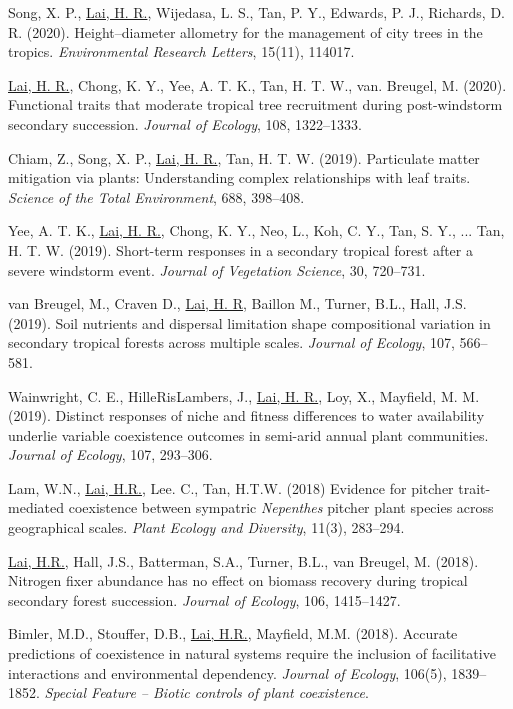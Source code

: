 \documentclass[a4paper]{article}
\begin{document}
\hangindent=1cm Song, X. P., \underline{Lai, H. R.}, Wijedasa, L. S., Tan, P. Y., Edwards, P. J., Richards, D. R. (2020). Height--diameter allometry for the management of city trees in the tropics. \textit{Environmental Research Letters}, 15(11), 114017.

\hangindent=1cm \underline{Lai, H. R.}, Chong, K. Y., Yee, A. T. K., Tan, H. T. W., van. Breugel, M. (2020). Functional traits that moderate tropical tree recruitment during post-windstorm secondary succession. \textit{Journal of Ecology}, 108, 1322--1333.

\hangindent=1cm Chiam, Z., Song, X. P., \underline{Lai, H. R.}, Tan, H. T. W. (2019). Particulate matter mitigation via plants: Understanding complex relationships with leaf traits. \textit{Science of the Total Environment}, 688, 398--408.

\hangindent=1cm Yee, A. T. K., \underline{Lai, H. R.}, Chong, K. Y., Neo, L., Koh, C. Y., Tan, S. Y., ... Tan, H. T. W. (2019). Short-term responses in a secondary tropical forest after a severe windstorm event. \textit{Journal of Vegetation Science}, 30, 720--731.

\hangindent=1cm van Breugel, M., Craven D., \underline{Lai, H. R}, Baillon M., Turner, B.L., Hall, J.S. (2019). Soil nutrients and dispersal limitation shape compositional variation in secondary tropical forests across multiple scales. \textit{Journal of Ecology}, 107, 566--581.

\hangindent=1cm Wainwright, C. E., HilleRisLambers, J., \underline{Lai, H. R.}, Loy, X., Mayfield, M. M. (2019). Distinct responses of niche and fitness differences to water availability underlie variable coexistence outcomes in semi-arid annual plant communities. \textit{Journal of Ecology}, 107, 293--306.

\hangindent=1cm Lam, W.N., \underline{Lai, H.R.}, Lee. C., Tan, H.T.W. (2018) Evidence for pitcher trait-mediated coexistence between sympatric \textit{Nepenthes} pitcher plant species across geographical scales. \textit{Plant Ecology and Diversity}, 11(3), 283--294.

\hangindent=1cm \underline{Lai, H.R.}, Hall, J.S., Batterman, S.A., Turner, B.L., van Breugel, M. (2018). Nitrogen fixer abundance has no effect on biomass recovery during tropical secondary forest succession. \textit{Journal of Ecology}, 106, 1415--1427.

\hangindent=1cm Bimler, M.D., Stouffer, D.B., \underline{Lai, H.R.}, Mayfield, M.M. (2018). Accurate predictions of coexistence in natural systems require the inclusion of facilitative interactions and environmental dependency. \textit{Journal of Ecology}, 106(5), 1839--1852. \textit{Special Feature -- Biotic controls of plant coexistence}.
\end{document}
